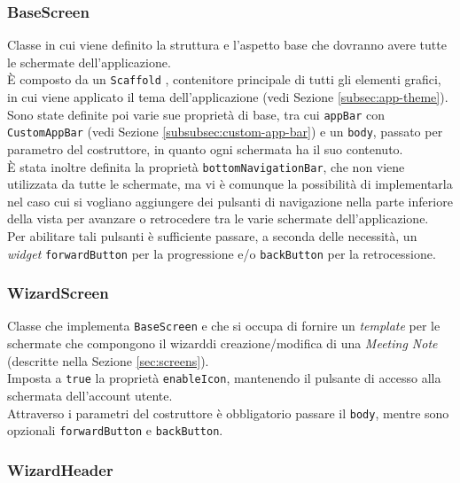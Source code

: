 \subsubsection*{BaseScreen}
\label{subsubsec:base-screen}

Classe in cui viene definito la struttura e l'aspetto base che dovranno avere tutte le schermate dell'applicazione.\\
È composto da un \lstinline{Scaffold} \cite{site:scaffold}, contenitore principale di tutti gli elementi grafici, in cui viene applicato il tema dell'applicazione (vedi Sezione \ref{subsec:app-theme}). \\
Sono state definite poi varie sue proprietà di base, tra cui \lstinline{appBar} con \lstinline{CustomAppBar} (vedi Sezione \ref{subsubsec:custom-app-bar}) e un \lstinline{body}, passato per parametro del costruttore, in quanto ogni schermata ha il suo contenuto.\\
È stata inoltre definita la proprietà \lstinline{bottomNavigationBar}, che non viene utilizzata da tutte le schermate, ma vi è comunque la possibilità di implementarla nel caso cui si vogliano aggiungere dei pulsanti di navigazione nella parte inferiore della vista per avanzare o retrocedere tra le varie schermate dell'applicazione.\\
Per abilitare tali pulsanti è sufficiente passare, a seconda delle necessità, un \emph{widget} \lstinline{forwardButton} per la progressione e/o \lstinline{backButton} per la retrocessione.

\subsubsection*{WizardScreen}
\label{subsubsec:wizard-screen}

Classe che implementa \lstinline{BaseScreen} e che si occupa di fornire un \emph{template} per le schermate che compongono il \gls{wizard}\glsoccur di creazione/modifica di una \emph{Meeting Note} (descritte nella Sezione \ref{sec:screens}).\\
Imposta a \lstinline{true} la proprietà \lstinline{enableIcon}, mantenendo il pulsante di accesso alla schermata dell'account utente.\\
Attraverso i parametri del costruttore è obbligatorio passare il \lstinline{body}, mentre sono opzionali \lstinline{forwardButton} e \lstinline{backButton}.

\subsubsection*{WizardHeader}
\label{subsubsec:wizard-header}

